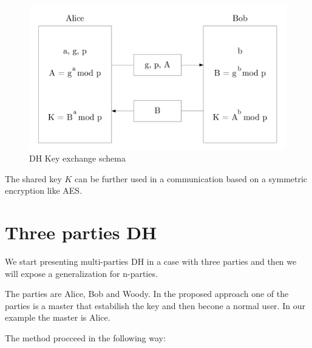 \documentclass[11pt]{article}
\begin{document}
\begin{figure}[!ht]
    \centering
    \includegraphics[width=1\textwidth]{dhimg-hw4-1692419}
    \caption{DH Key exchange schema}
    \label{fig:dhimg}
\end{figure}

The shared key $K$ can be further used in a communication based on a symmetric encryption like AES.

\section{Three parties DH}

We start presenting multi-parties DH in a case with three parties and then we will expose a generalization for n-parties.

The parties are Alice, Bob and Woody. In the proposed approach one of the parties is a master that estabilish the key and then becone a normal user. In our example the master is Alice.

The method procceed in the following way:
\end{document}
